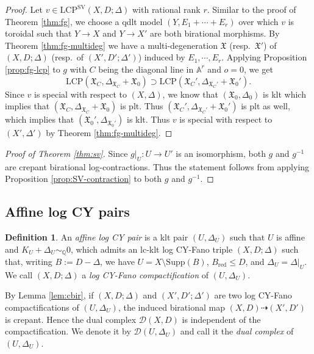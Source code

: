 \documentclass[reqno, 12pt]{amsart}
\theoremstyle{definition}
\newtheorem{defn}[prop]{Definition}
\newcommand{\bA}{\mathbb{A}}
\newcommand{\bQ}{\mathbb{Q}}
\newcommand{\cD}{\mathcal{D}}
\newcommand{\Supp}{\mathrm{Supp}}
\newcommand{\fX}{\mathfrak{X}}
\newcommand{\SV}{\mathrm{SV}}
\newcommand{\LCP}{\mathrm{LCP}}
\newcommand{\red}{\mathrm{red}}
\numberwithin{equation}{section}
\begin{document}
\begin{proof}
Let $v\in\LCP^{\SV}(X,D;\Delta)$ with rational rank $r$. Similar to the proof of Theorem \ref{thm:fg}, we choose a qdlt model $(Y, E_1+\cdots + E_r)$ over which $v$ is toroidal such that $Y\to X$ and $Y\to X'$ are both birational morphisms.
By Theorem \ref{thm:fg-multideg} we have a multi-degeneration $\fX$ (resp.\ $\fX'$) of $(X,D;\Delta)$ (resp.\ of $(X',D';\Delta')$) induced by $E_1,\cdots, E_r$. Applying Proposition \ref{prop:fg-lcp} to $g$ with $C$ being the diagonal line in $\bA^r$ and $o = 0$, we get
\[
\LCP(\fX_C, \Delta_{\fX_C}+ \fX_0) \supset \LCP(\fX_C', \Delta_{\fX_C'}+ \fX_0').
\]
Since  $v$ is special with respect to $(X,\Delta)$, we know that $(\fX_0, \Delta_0)$ is klt which implies that $(\fX_C, \Delta_{\fX_C} + \fX_0)$ is plt. Thus $(\fX_C', \Delta_{\fX_C'}+ \fX_0') $ is plt as well, which implies that $(\fX_0', \Delta_{\fX_0'})$ is klt. Thus $v$ is special with respect to $(X',\Delta')$ by Theorem \ref{thm:fg-multideg}.
\end{proof}

\begin{proof}[Proof of Theorem \ref{thm:sv}]
Since $g|_U: U\to U'$ is an isomorphism, both $g$ and $g^{-1}$ are crepant birational log-contractions.
Thus the statement follows from applying Proposition \ref{prop:SV-contraction} to both $g$ and $g^{-1}$.
\end{proof}


\subsection{Affine log CY pairs}\label{sec:affine-CY}

\begin{defn}
An \emph{affine log CY pair} is a klt pair $(U,\Delta_U)$ such that $U$
is affine and $K_U+\Delta_U\sim_{\bQ}0$, which admits an lc-klt
log CY-Fano triple $(X,D;\Delta)$ such that, writing $B:=D-\Delta$, we have $U=X\setminus\Supp(B)$, $B_{\red}\leq D$, and $\Delta_U=\Delta|_U$.
We call $(X,D;\Delta)$ a \emph{log CY-Fano compactification} of
$(U,\Delta_U)$.

By Lemma \ref{lem:cbir}, if \((X,D;\Delta)\) and \((X',D';\Delta')\) are two log CY-Fano compactifications of \((U,\Delta_U)\), the induced birational map \((X,D)\dashrightarrow(X',D')\) is crepant. Hence the dual complex \(\mathcal D(X,D)\) is independent of the compactification. We denote it by
$\cD(U,\Delta_U)$ and call it the \emph{dual complex} of $(U,\Delta_U)$.
\end{defn}
\end{document}
